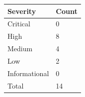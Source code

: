 \documentclass{article}
\begin{document}
                \begin{minipage}{.40\textwidth}
                \renewcommand{\arraystretch}{1.63}
                \begin{tabular}{|p{11em}|>{\centering\arraybackslash}p{6em}|}
                \hline
                \normalsize \cellcolor{black!10} \textbf{Severity} & \normalsize \cellcolor{black!10} \textbf{Count} \\
                 \hline
                 \normalsize Critical &   \normalsize \cellcolor{critical} 0  \\
                 \hline
                 \normalsize High & \normalsize \cellcolor{high} 8 \\
                 \hline
                 \normalsize Medium & \normalsize \cellcolor{medium} 4 \\
                 \hline
                 \normalsize Low & \normalsize \cellcolor{low} 2 \\
                 \hline
                 \normalsize Informational & \normalsize \cellcolor{info} 0 \\
                 \hline
                 \normalsize Total & \normalsize \cellcolor{total} 14 \\
                 \hline    
                \end{tabular}
                \end{minipage}


                

                

            \newpage
\end{document}
